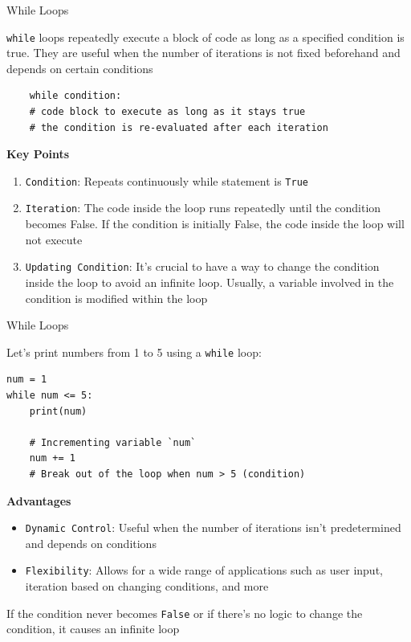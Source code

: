 \documentclass[
	11pt, 
]{beamer}
\begin{document}
\begin{frame}[fragile]{While Loops}

\texttt{while} loops repeatedly execute a block of code as long as a specified condition is true. They are useful when the number of iterations is not fixed beforehand and depends on certain conditions

\begin{verbatim}
    while condition:
    # code block to execute as long as it stays true
    # the condition is re-evaluated after each iteration
\end{verbatim}

\begin{block}{\textbf{Key Points}}
    \begin{enumerate}
        \item \texttt{Condition}: Repeats continuously while statement is \texttt{True}

        \item \texttt{Iteration}: The code inside the loop runs repeatedly until the condition becomes False. If the condition is initially False, the code inside the loop will not execute

        \item  \texttt{Updating Condition}: It's crucial to have a way to change the condition inside the loop to avoid an infinite loop. Usually, a variable involved in the condition is modified within the loop
    \end{enumerate}
\end{block}

\end{frame}


\begin{frame}[fragile]{While Loops}

Let's print numbers from 1 to 5 using a \texttt{while} loop:

\begin{verbatim}
num = 1
while num <= 5:
    print(num)
    
    # Incrementing variable `num` 
    num += 1 
    # Break out of the loop when num > 5 (condition)
\end{verbatim}

\begin{block}{\textbf{Advantages}}
    \begin{itemize}
        \item \texttt{Dynamic Control}: Useful when the number of iterations isn't predetermined and depends on conditions

        \item \texttt{Flexibility}: Allows for a wide range of applications such as user input, iteration based on changing conditions, and more

    \end{itemize}
\end{block}

 If the condition never becomes \texttt{False} or if there's no logic to change the condition, it causes an infinite loop

\end{frame}
\end{document}
